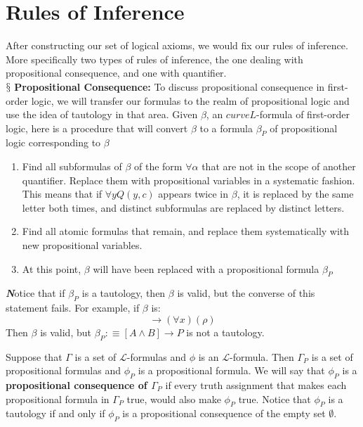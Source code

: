 \documentclass[9pt,a4paper]{article}
\newenvironment{callout}
	{\begin{calloutbox}\color{charcoal}\textbf\textit}
	{\end{calloutbox}}
\newcommand{\newpoint}[1]{\ \\ \indent$\mathsection$ \textbf{#1}}
\newcommand{\curveL}{\mathcal{L}}
\begin{document}
    \section*{Rules of Inference}
        After constructing our set of logical axioms, we would fix our rules of inference. More specifically two types of rules of inference, the one dealing with propositional consequence, and one with quantifier.
        \newpoint{Propositional Consequence:} To discuss propositional consequence in first-order logic, we will transfer our formulas to the realm of propositional logic and use the idea of tautology in that area. Given $\beta$, an $curveL$-formula of first-order logic, here is a procedure that will convert $\beta$ to a formula $\beta_P$ of propositional logic corresponding to $\beta$
        \begin{enumerate}
            \item Find all subformulas of $\beta$ of the form $\forall \alpha$ that are not in the scope of another quantifier. Replace them with propositional variables in a systematic fashion. This means that if $\forall y Q(y,c)$ appears twice in $\beta$, it is replaced by the same letter both times, and distinct subformulas are replaced by distinct letters.
            \item Find all atomic formulas that remain, and replace them systematically with new propositional variables.
            \item At this point, $\beta$ will have been replaced with a propositional formula $\beta_P$
        \end{enumerate}
        \begin{callout}
            Notice that if $\beta_P$ is a tautology, then $\beta$ is valid, but the converse of this statement fails. For example, if $\beta$ is:
            \begin{equation}
                [(\forall x)(\theta)\land(\forall x)(\theta\rightarrow \rho)]\rightarrow (\forall x)(\rho)
            \end{equation}
            Then $\beta$ is valid, but $\beta_P:\equiv [A\land B]\rightarrow P$ is not a tautology.
        \end{callout}
        \begin{define}
            Suppose that $\Gamma$ is a set of $\curveL$-formulas and $\phi$ is an $\curveL$-formula. Then $\Gamma_P$ is a set of propositional formulas and $\phi_P$ is a propositional formula. We will say that $\phi_P$ is a \textbf{propositional consequence of $\Gamma_P$} if every truth assignment that makes each propositional formula in $\Gamma_P$ true, would also make $\phi_P$ true. Notice that $\phi_P$ is a tautology if and only if $\phi_P$ is a propositional consequence of the empty set $\emptyset$.
        \end{define}
\end{document}
